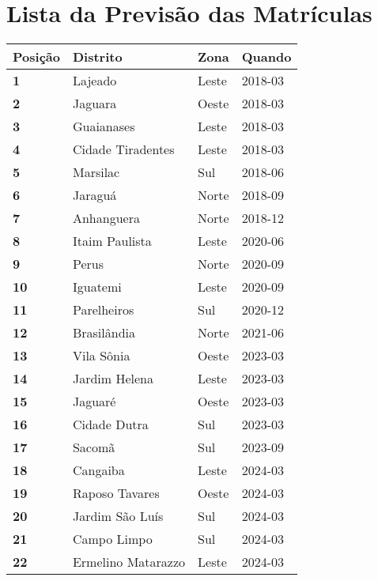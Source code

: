 \newpage

\section{Lista da Previsão das Matrículas}

\begin{table}[H]
	\centering
	\begin{tabular}{l|l|l|l}
		\textbf{Posição} & \textbf{Distrito} & \textbf{Zona} & \textbf{Quando} \\ \hline
		\textbf{1} & Lajeado & Leste & 2018-03\\ \hline
		\textbf{2} & Jaguara & Oeste & 2018-03\\ \hline
		\textbf{3} & Guaianases & Leste & 2018-03\\ \hline
		\textbf{4} & Cidade Tiradentes & Leste & 2018-03\\ \hline
		\textbf{5} & Marsilac & Sul & 2018-06\\ \hline
		\textbf{6} & Jaraguá & Norte & 2018-09\\ \hline
		\textbf{7} & Anhanguera & Norte & 2018-12\\ \hline
		\textbf{8} & Itaim Paulista & Leste & 2020-06\\ \hline
		\textbf{9} & Perus & Norte & 2020-09\\ \hline
		\textbf{10} & Iguatemi & Leste & 2020-09\\ \hline
		\textbf{11} & Parelheiros & Sul & 2020-12\\ \hline
		\textbf{12} & Brasilândia & Norte & 2021-06\\ \hline
		\textbf{13} & Vila Sônia & Oeste & 2023-03\\ \hline
		\textbf{14} & Jardim Helena & Leste & 2023-03\\ \hline
		\textbf{15} & Jaguaré & Oeste & 2023-03\\ \hline
		\textbf{16} & Cidade Dutra & Sul & 2023-03\\ \hline
		\textbf{17} & Sacomã & Sul & 2023-09\\ \hline
		\textbf{18} & Cangaiba & Leste & 2024-03\\ \hline
		\textbf{19} & Raposo Tavares & Oeste & 2024-03\\ \hline
		\textbf{20} & Jardim São Luís & Sul & 2024-03\\ \hline
		\textbf{21} & Campo Limpo & Sul & 2024-03\\ \hline
		\textbf{22} & Ermelino Matarazzo & Leste & 2024-03\\ \hline

\end{tabular}
\end{table}
